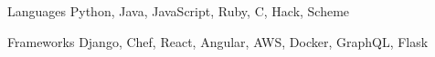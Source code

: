 
\begin{cvskills}
  \cvskill
    {Languages} %
    {Python, Java, JavaScript, Ruby, C, Hack, Scheme} %

  \cvskill
    {Frameworks} %
    {Django, Chef, React, Angular, AWS, Docker, GraphQL, Flask} %
\end{cvskills}
